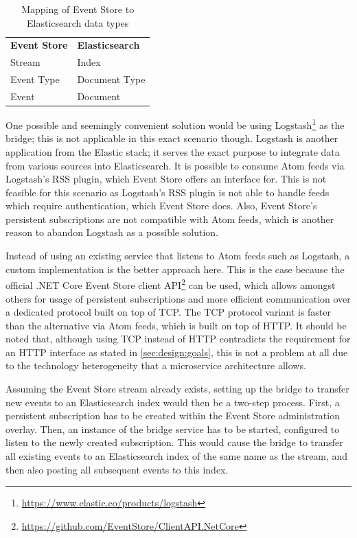 \begin{table}[]
\centering
\caption{Mapping of Event Store to Elasticsearch data types}
\label{table:design:bridge}
\begin{tabular}{l|l}
\textbf{Event Store} & \textbf{Elasticsearch} \\ \cline{1-2}
Stream & Index \\
Event Type & Document Type \\
Event & Document
\end{tabular}
\end{table}

One possible and seemingly convenient solution would be using Logstash\footnote{\url{https://www.elastic.co/products/logstash}} as the bridge; this is not applicable in this exact scenario though.
Logstash is another application from the Elastic stack; it serves the exact purpose to integrate data from various sources into Elasticsearch.
It is possible to consume Atom feeds via Logstash's \ac{RSS} plugin, which Event Store offers an interface for.
This is not feasible for this scenario as Logstash's \ac{RSS} plugin is not able to handle feeds which require authentication, which Event Store does.
Also, Event Store's persistent subscriptions are not compatible with Atom feeds, which is another reason to abandon Logstash as a possible solution.

Instead of using an existing service that listens to Atom feeds such as Logstash, a custom implementation is the better approach here.
This is the case because the official .NET Core Event Store client \ac{API}\footnote{\url{https://github.com/EventStore/ClientAPI.NetCore}} can be used, which allows amongst others for usage of persistent subscriptions and more efficient communication over a dedicated protocol built on top of \ac{TCP}.
The \ac{TCP} protocol variant is faster than the alternative via Atom feeds, which is built on top of \ac{HTTP}\cite{WEB:EvtSt-Which-Api}.
It should be noted that, although using \ac{TCP} instead of \ac{HTTP} contradicts the requirement for an \ac{HTTP} interface as stated in \cref{sec:design:goals}, this is not a problem at all due to the technology heterogeneity that a microservice architecture allows\cite[Key Benefits,pp.~4f]{newman2015building}.

Assuming the Event Store stream already exists, setting up the bridge to transfer new events to an Elasticsearch index would then be a two-step process.
First, a persistent subscription has to be created within the Event Store administration overlay.
Then, an instance of the bridge service has to be started, configured to listen to the newly created subscription.
This would cause the bridge to transfer all existing events to an Elasticsearch index of the same name as the stream, and then also posting all subsequent events to this index.

